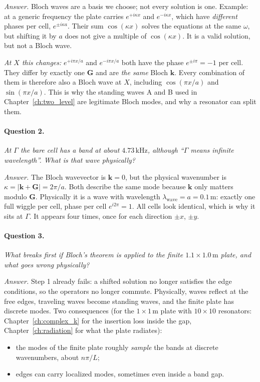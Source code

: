 \emph{Answer.} Bloch waves are a basis we choose; not every solution is one.
Example: at a generic frequency the plate carries $e^{+i\kappa x}$ and
$e^{-i\kappa x}$, which have \emph{different} phases per cell,
$e^{\pm i\kappa a}$. Their sum $\cos(\kappa x)$ solves the equations at the
same $\omega$, but shifting it by $a$ does not give a multiple of
$\cos(\kappa x)$. It is a valid solution, but not a Bloch wave.

\emph{At $X$ this changes:} $e^{+i\pi x/a}$ and $e^{-i\pi x/a}$ both have the
phase $e^{\pm i\pi} = -1$ per cell. They differ by exactly one $\mathbf{G}$
and are \emph{the same} Bloch $\mathbf{k}$. Every combination of them is
therefore also a Bloch wave at $X$, including $\cos(\pi x/a)$ and
$\sin(\pi x/a)$. This is why the standing waves A and B used in
Chapter~\ref{ch:two_level} are legitimate Bloch modes, and why a resonator can
split them.

\paragraph{Question 2.} \emph{At $\Gamma$ the bare cell has a band at about
$4.73\,\mathrm{kHz}$, although ``$\Gamma$ means infinite wavelength''. What is
that wave physically?}

\emph{Answer.} The Bloch wavevector is $\mathbf{k} = 0$, but the physical
wavenumber is $\kappa = |\mathbf{k} + \mathbf{G}| = 2\pi/a$. Both describe the
same mode because $\mathbf{k}$ only matters modulo $\mathbf{G}$. Physically
it is a wave with wavelength $\lambda_\mathrm{wave} = a = 0.1\,\mathrm{m}$:
exactly one full wiggle per cell, phase per cell $e^{i2\pi} = 1$. All cells
look identical, which is why it sits at $\Gamma$. It appears four times, once
for each direction $\pm x$, $\pm y$.

\paragraph{Question 3.} \emph{What breaks first if Bloch's theorem is applied
to the finite $1.1 \times 1.0\,\mathrm{m}$ plate, and what goes wrong
physically?}

\emph{Answer.} Step 1 already fails: a shifted solution no longer satisfies
the edge conditions, so the operators no longer commute. Physically, waves
reflect at the free edges, traveling waves become standing waves, and the
finite plate has discrete modes. Two consequences (for the $1 \times 1\,\mathrm{m}$
plate with $10 \times 10$ resonators: Chapter~\ref{ch:complex_k} for the insertion loss
inside the gap, Chapter~\ref{ch:radiation} for what the plate radiates):
\begin{itemize}
  \item the modes of the finite plate roughly \emph{sample} the bands at
        discrete wavenumbers, about $n\pi/L$;
  \item edges can carry localized modes, sometimes even inside a band gap.
\end{itemize}
